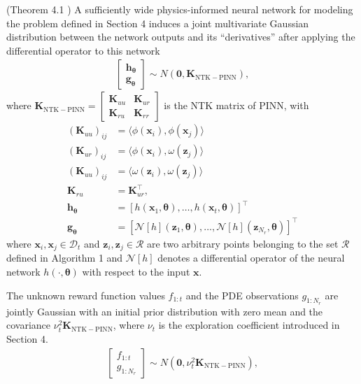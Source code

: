 \begin{lemma}{(Theorem 4.1 \citet{wang2022and})}
\label{lemma:PINN_GP}
A sufficiently wide physics-informed neural network for modeling the problem defined in Section 4 induces a joint multivariate
Gaussian distribution between the network outputs and its ``derivatives'' after applying the differential operator to this network
\begin{align}
    \begin{bmatrix}
        \mathbf{h}_{\boldsymbol{\theta}} \\
        \mathbf{g}_{\boldsymbol{\theta}} 
\end{bmatrix} \sim N(\mathbf{0}, \mathbf{K}_\mathrm{NTK-PINN}),
\end{align} 
where $\mathbf{K}_\mathrm{NTK-PINN} = \begin{bmatrix}
    \mathbf{K}_{uu} & \mathbf{K}_{ur} \\
    \mathbf{K}_{ru} & \mathbf{K}_{rr}
\end{bmatrix}$ is the NTK matrix of PINN, with
\begin{align}
    (\mathbf{K}_{uu})_{ij} &= \langle \phi(\mathbf{x}_i), \phi(\mathbf{x}_j) \rangle \\ 
    (\mathbf{K}_{ur})_{ij} &= \langle \phi(\mathbf{x}_i), \omega(\mathbf{z}_j) \rangle
    \\
    (\mathbf{K}_{uu})_{ij} &= \langle \omega(\mathbf{z}_i), \omega(\mathbf{z}_j) \rangle
    \\
    \mathbf{K}_{ru} &= \mathbf{K}_{ur}^\top, \\ 
    \mathbf{h}_{\boldsymbol{\theta}} &= [h(\mathbf{x}_1, \boldsymbol{\theta}), \dots, h(\mathbf{x}_t, \boldsymbol{\theta})]^\top
    \\
    \mathbf{g}_{\boldsymbol{\theta}} &= \left[\mathcal{N}[h](\mathbf{z}_1, \boldsymbol{\theta}), \dots, \mathcal{N}[h](\mathbf{z}_{N_r}, \boldsymbol{\theta}) \right]^\top
\end{align}
where $\mathbf{x}_i, \mathbf{x}_j \in \mathcal{D}_t$ and $\mathbf{z}_i, \mathbf{z}_j \in \mathcal{R}$ are two arbitrary points belonging to the set $\mathcal{R}$ defined in Algorithm 1 and $\mathcal{N}[h]$ denotes a differential operator of the neural network $h(\cdot, \boldsymbol{\theta})$ with respect to the input $\mathbf{x}$. 
\end{lemma}
\begin{subcorollary}
\label{corollary:pinn-bo_PINN_GP_func}
    The unknown reward function values $f_{1:t}$ and the PDE observations $g_{1:N_r}$ are jointly Gaussian with an initial prior distribution with zero mean and the covariance $\nu_t^2 \mathbf{K}_\mathrm{NTK-PINN}$, where $\nu_t$ is the exploration coefficient introduced in Section 4. 
    \begin{align}
    \begin{bmatrix}
        f_{1:t} \\
        g_{1:N_r}
\end{bmatrix} \sim N(\mathbf{0}, \nu_t^2 \mathbf{K}_\mathrm{NTK-PINN}),
\end{align} 
\end{subcorollary}

